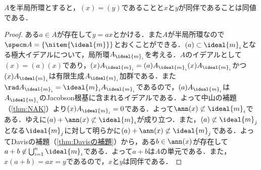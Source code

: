 \begin{prop}\label{prop:半局所環と同伴関係}
	$A$を半局所環とすると，$(x)=(y)$であることと$x$と$y$が同伴であることは同値である．
\end{prop}

\begin{proof}
	ある$a\in A$が存在して$y=ax$とかける．また$A$が半局所環なので$\specm A=\{\nitem{\ideal{m}}\}$とおくことができる．$(a)\subset\ideal{m}_i$となる極大イデアルについて，局所環$A_{\ideal{m}_i}$を考える．$A$のイデアルとして$(x)=(a)(x)$であり，$(x)A_{\ideal{m}_i}=(a)A_{\ideal{m}_i}(x)A_{\ideal{m}_i}$かつ$(x)A_{\ideal{m}_i}$は有限生成$A_{\ideal{m}_i}$加群である．また$\rad A_{\ideal{m}_i}=\ideal{m}_iA_{\ideal{m}_i}$であるので，$(a)A_{\ideal{m}_i}$は$A_{\ideal{m}_i}$のJacobson根基に含まれるイデアルである．よって中山の補題（\ref{thm:NAK}）より$(x)A_{\ideal{m}_i}=0$である．よって$\ann (x)\not\subset\ideal{m}_i$である．ゆえに$(a)+\ann (x)\not\subset\ideal{m}_i$が成り立つ．また，$(a)\not\subset\ideal{m}_j$となる$\ideal{m}_j$に対して明らかに$(a)+\ann (x)\not\subset\ideal{m}_j$である．よってDavisの補題（\ref{thm:Davisの補題}）から，ある$b\in\ann(x)$が存在して$a+b\not\in\bigcup_{i=1}^n\ideal{m}_i$である．よって$a+b$は$A$の単元である．また，$x(a+b)=ax=y$であるので，$x$と$y$は同伴である．
\end{proof}

